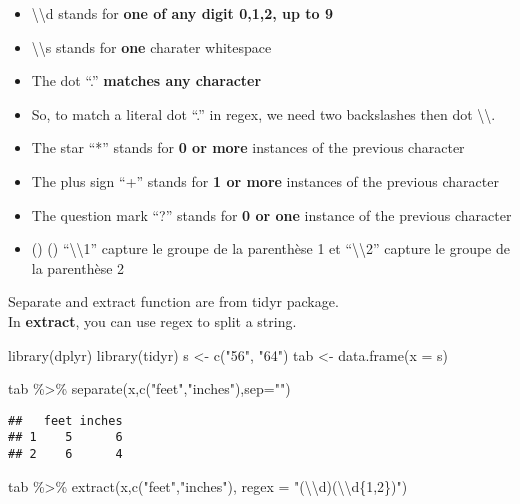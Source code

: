 \documentclass[
]{book}
\newenvironment{Shaded}{\begin{snugshade}}{\end{snugshade}}
\newcommand{\AttributeTok}[1]{\textcolor[rgb]{0.77,0.63,0.00}{#1}}
\newcommand{\FunctionTok}[1]{\textcolor[rgb]{0.00,0.00,0.00}{#1}}
\newcommand{\NormalTok}[1]{#1}
\newcommand{\OtherTok}[1]{\textcolor[rgb]{0.56,0.35,0.01}{#1}}
\newcommand{\SpecialCharTok}[1]{\textcolor[rgb]{0.00,0.00,0.00}{#1}}
\newcommand{\StringTok}[1]{\textcolor[rgb]{0.31,0.60,0.02}{#1}}
\providecommand{\tightlist}{%
  \setlength{\itemsep}{0pt}\setlength{\parskip}{0pt}}
\begin{document}
\begin{itemize}
\tightlist
\item
  \textbackslash\textbackslash d stands for \textbf{one of any digit 0,1,2, up to 9}
\item
  \textbackslash\textbackslash s stands for \textbf{one } charater whitespace
\item
  The dot ``.'' \textbf{matches any character}
\item
  So, to match a literal dot ``.'' in regex, we need two backslashes then dot \textbackslash\textbackslash.
\item
  The star ``*'' stands for \textbf{0 or more} instances of the previous character
\item
  The plus sign ``+'' stands for \textbf{1 or more} instances of the previous character
\item
  The question mark ``?'' stands for \textbf{0 or one} instance of the previous character
\item
  () () ``\textbackslash\textbackslash1'' capture le groupe de la parenthèse 1 et ``\textbackslash\textbackslash2'' capture le groupe de la parenthèse 2
\end{itemize}

Separate and extract function are from tidyr package.\\
In \textbf{extract}, you can use regex to split a string.

\begin{Shaded}
\begin{Highlighting}[]
\FunctionTok{library}\NormalTok{(dplyr)}
\FunctionTok{library}\NormalTok{(tidyr)}
\NormalTok{s }\OtherTok{\textless{}{-}} \FunctionTok{c}\NormalTok{(}\StringTok{"5\textquotesingle{}6"}\NormalTok{, }\StringTok{"6\textquotesingle{}4"}\NormalTok{)}
\NormalTok{tab }\OtherTok{\textless{}{-}} \FunctionTok{data.frame}\NormalTok{(}\AttributeTok{x =}\NormalTok{ s)}

\NormalTok{tab }\SpecialCharTok{\%\textgreater{}\%} \FunctionTok{separate}\NormalTok{(x,}\FunctionTok{c}\NormalTok{(}\StringTok{"feet"}\NormalTok{,}\StringTok{"inches"}\NormalTok{),}\AttributeTok{sep=}\StringTok{"\textquotesingle{}"}\NormalTok{)}
\end{Highlighting}
\end{Shaded}

\begin{verbatim}
##   feet inches
## 1    5      6
## 2    6      4
\end{verbatim}

\begin{Shaded}
\begin{Highlighting}[]
\NormalTok{tab }\SpecialCharTok{\%\textgreater{}\%} \FunctionTok{extract}\NormalTok{(x,}\FunctionTok{c}\NormalTok{(}\StringTok{"feet"}\NormalTok{,}\StringTok{"inches"}\NormalTok{), }\AttributeTok{regex =} \StringTok{"(}\SpecialCharTok{\textbackslash{}\textbackslash{}}\StringTok{d)\textquotesingle{}(}\SpecialCharTok{\textbackslash{}\textbackslash{}}\StringTok{d\{1,2\})"}\NormalTok{)}
\end{Highlighting}
\end{Shaded}
\end{document}
